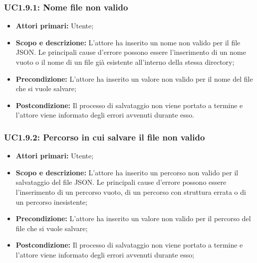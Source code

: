 \subsubsection{UC1.9.1: Nome file non valido} 
\begin{itemize} 
	\item{\textbf{Attori primari:} Utente;} 
	\item{\textbf{Scopo e descrizione:} L'attore ha inserito un nome non valido per il file JSON. Le principali cause d'errore possono essere l'inserimento di un nome vuoto o il nome di un file già esistente all'interno della stessa directory;} 
	\item{\textbf{Precondizione:} L'attore ha inserito un valore non valido per il nome del file che si vuole salvare;} 
	\item{\textbf{Postcondizione:} Il processo di salvataggio non viene portato a termine e l'attore viene informato degli errori avvenuti durante esso.} 
\end{itemize} 
\subsubsection{UC1.9.2: Percorso in cui salvare il file non valido} 
\begin{itemize} 
	\item{\textbf{Attori primari:} Utente;} 
	\item{\textbf{Scopo e descrizione:} L'attore ha inserito un percorso non valido per il salvataggio del file JSON. Le principali cause d'errore possono essere l'inserimento di un percorso vuoto, di un percorso con struttura errata o di un percorso inesistente;} 
	\item{\textbf{Precondizione:} L'attore ha inserito un valore non valido per il percorso del file che si vuole salvare;} 
	\item{\textbf{Postcondizione:} Il processo di salvataggio non viene portato a termine e l'attore viene informato degli errori avvenuti durante esso;} 
\end{itemize} 
